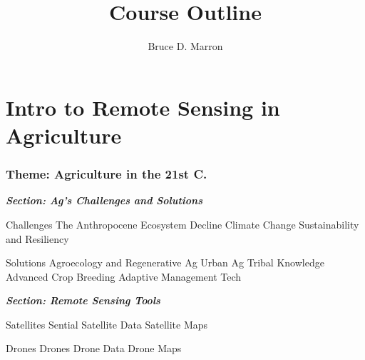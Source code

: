 \documentclass[12pt, letterpaper]{article}
\title{\vspace{-5mm}\fontsize{14pt}{10pt}
                    \selectfont \textbf{Course Outline}   %
                    \vspace{-7mm}
      }
\author{
     \normalsize Bruce D. Marron \\                     %
     \vspace{-5mm}
}
\date{}
\begin{document}
\begin{singlespacing}
\maketitle                                      %
\end{singlespacing}
\thispagestyle{fancy}                           %


\part{Intro to Remote Sensing in Agriculture}


\section{Theme: Agriculture in the 21st C.}

\large
\begin{flushleft}
\textbf{\textit{Section: Ag's Challenges and Solutions}}
\end{flushleft}
\normalsize

\begin{outline}[enumerate]
\1 Challenges
\2 The Anthropocene
\2 Ecosystem Decline
\2 Climate Change
\2 Sustainability and Resiliency

\1 Solutions
\2 Agroecology and Regenerative Ag
\2 Urban Ag
\2 Tribal Knowledge
\2 Advanced Crop Breeding
\2 Adaptive Management
\2 Tech
\end{outline}


\large
\begin{flushleft}
\textbf{\textit{Section: Remote Sensing Tools}}
\end{flushleft}
\normalsize

\begin{outline}[enumerate]

\1 Satellites
\2 Sential
\2 Satellite Data
\2 Satellite Maps

\1 Drones
\2 Drones
\2 Drone Data
\2 Drone Maps
\end{outline}
\end{document}
